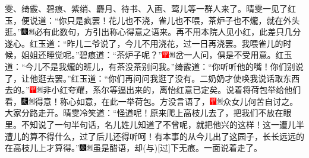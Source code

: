 雯、绮霰、碧痕、紫绡、麝月、待书、入画、莺儿等一群人来了。晴雯一见了红玉，便说道：“你只是疯罢！花儿也不浇，雀儿也不喂，茶炉子也不爖，就在外头逛。”{\includegraphics[width=3mm]{../Images/00004}\includegraphics[width=3mm]{../Images/00011}\footnotesize \kaishu 必有此数句，方引出称心得意之语来。再不用本院人见小红，此差只几分遂心。}红玉道：“昨儿二爷说了，今儿不用浇花，过一日再浇罢。我喂雀儿的时候，姐姐还睡觉呢。”碧痕道：“茶炉子呢？”{\includegraphics[width=3mm]{../Images/00002}\includegraphics[width=3mm]{../Images/00011}\footnotesize \kaishu 岔一人问，俱是不受用意。}红玉道：“今儿不是我爖的班儿，有茶没茶别问我。”绮霰道：“你听听他的嘴！你们别说了，让他逛去罢。”红玉道：“你们再问问我逛了没有。二奶奶才使唤我说话取东西去的。”{\includegraphics[width=3mm]{../Images/00002}\includegraphics[width=3mm]{../Images/00011}\footnotesize \kaishu 非小红夸耀，系尔等逼出来的，离怡红意已定矣。}说着将荷包举给他们看，{\includegraphics[width=3mm]{../Images/00004}\includegraphics[width=3mm]{../Images/00011}\footnotesize \kaishu 得意！称心如意，在此一举荷包。}方没言语了，{\includegraphics[width=3mm]{../Images/00002}\includegraphics[width=3mm]{../Images/00011}\footnotesize \kaishu 众女儿何苦自讨之。}大家分路走开。晴雯冷笑道：“怪道呢！原来爬上高枝儿去了，把我们不放在眼里。不知说了一句半句话，名儿姓儿知道了不曾呢，就把他兴的这样！这一遭儿半遭儿的算不得什么，过了后儿还得听呵！有本事的从今儿出了这园子，长长远远的在高枝儿上才算得。”{{\includegraphics[width=3mm]{../Images/00004}\includegraphics[width=3mm]{../Images/00011}\footnotesize \kaishu 虽是醋语，却{(与)}{[}过{]}下无痕。}}一面说着走了。

